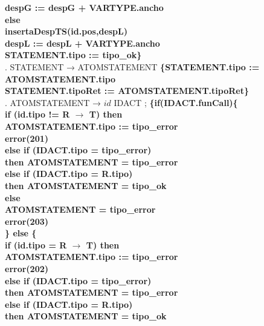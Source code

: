 \begin{tabbing}
    \>                    \> \> \textbf{despG := despG + VARTYPE.ancho}\\
    \>                    \> \textbf{else}\\
    \>                    \> \> \textbf{insertaDespTS(id.pos,despL)}\\
    \>                    \> \> \textbf{despL := despL + VARTYPE.ancho}\\
    \>                    \> \textbf{STATEMENT.tipo := tipo\_ok\}}\\
    . STATEMENT → ATOMSTATEMENT \textbf{\{STATEMENT.tipo := ATOMSTATEMENT.tipo}\\
    \>                    \> \textbf{STATEMENT.tipoRet := ATOMSTATEMENT.tipoRet\}}\\

    . ATOMSTATEMENT → $id$ IDACT ; \> \> \textbf{\{if(IDACT.funCall)\{}\\
    \> \> \> \textbf{if (id.tipo != R $\rightarrow$ T) then}\\
    \> \> \> \> \textbf{ATOMSTATEMENT.tipo := tipo\_error}\\
    \> \> \> \> \textbf{error(201)}\\
    \> \> \> \textbf{else if (IDACT.tipo = tipo\_error)}\\
    \> \> \> \> \textbf{then ATOMSTATEMENT = tipo\_error}\\
    \> \> \> \textbf{else if (IDACT.tipo = R.tipo)}\\
    \> \> \> \> \textbf{then ATOMSTATEMENT = tipo\_ok}\\
    \> \> \> \textbf{else}\\
    \> \> \> \> \textbf{ATOMSTATEMENT = tipo\_error}\\
    \> \> \> \> \textbf{error(203)}\\
    \> \> \textbf{\} else \{}\\
    \> \> \> \textbf{if (id.tipo = R $\rightarrow$ T) then}\\
    \> \> \> \> \textbf{ATOMSTATEMENT.tipo := tipo\_error}\\
    \> \> \> \> \textbf{error(202)}\\
    \> \> \> \textbf{else if (IDACT.tipo = tipo\_error)}\\
    \> \> \> \> \textbf{then ATOMSTATEMENT = tipo\_error}\\
    \> \> \> \textbf{else if (IDACT.tipo = R.tipo)}\\
    \> \> \> \> \textbf{then ATOMSTATEMENT = tipo\_ok}\\

\end{tabbing}
